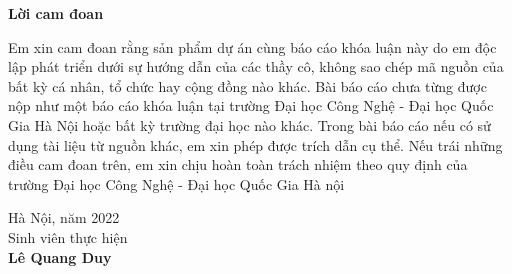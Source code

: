 \begin{center}
\textbf{\large{Lời cam đoan}	}
\end{center}
Em xin cam đoan rằng sản phẩm dự án cùng báo cáo khóa luận này do em độc
lập phát triển dưới sự hướng dẫn của các thầy cô, không sao chép mã nguồn của bất
kỳ cá nhân, tổ chức hay cộng đồng nào khác. Bài báo cáo chưa từng được nộp như
một báo cáo khóa luận tại trường Đại học Công Nghệ - Đại học Quốc Gia Hà Nội
hoặc bất kỳ trường đại học nào khác.
Trong bài báo cáo nếu có sử dụng tài liệu từ nguồn khác, em xin phép được
trích dẫn cụ thể.
Nếu trái những điều cam đoan trên, em xin chịu hoàn toàn trách nhiệm theo
quy định của trường Đại học Công Nghệ - Đại học Quốc Gia Hà nội

\vspace{1cm}
\begin{flushright}
    Hà Nội, năm 2022\\
    Sinh viên thực hiện\\[0.5cm]
    \textbf{Lê Quang Duy}
\end{flushright}
